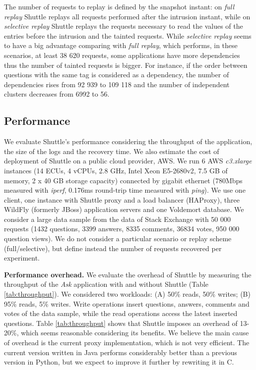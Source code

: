 The number of requests to replay is defined by the snapshot instant: on \textit{full replay} Shuttle replays all requests performed after the intrusion instant, while on \textit{selective replay} Shuttle replays the requests necessary to read the values of the entries before the intrusion and the tainted requests. While  \textit{selective replay} seems to have a big advantage comparing with  \textit{full replay}, which performs, in these scenarios, at least 38 620 requests, some applications have more dependencies thus the number of tainted requests is bigger. For instance, if the order between questions with the same tag is considered as a dependency, the number of dependencies rises from 92 939 to 109 118 and the number of independent clusters decreases from 6992 to 56. %



\subsection{Performance}
\label{sec:evaluation:performance}

We evaluate Shuttle's performance considering the throughput of the application, the size of the logs and the recovery time. We also estimate the cost of deployment of Shuttle on a public cloud provider, \acf{AWS}. We run 6 \ac{AWS} \textit{c3.xlarge} instances (14 ECUs, 4 vCPUs, 2.8 GHz, Intel Xeon E5-2680v2, 7.5 GB of memory, 2 x 40 GB storage capacity) connected by gigabit ethernet (780Mbps measured with \emph{iperf}, 0.176ms round-trip time measured with \emph{ping}). We use one client, one instance with Shuttle proxy and a load balancer (HAProxy), three WildFly (formerly JBoss) application servers and one Voldemort database. We consider a large data sample from the data of Stack Exchange with 50 000 requests (1432 questions, 3399 answers, 8335 comments, 36834 votes, 950 000 question views). We do not consider a particular scenario or replay scheme (full/selective), but define instead the number of requests recovered per experiment.

\textbf{Performance overhead.}
We evaluate the overhead of Shuttle by measuring the throughput of the \textit{Ask} application with and without Shuttle (Table \ref{tab:throughput}). We considered two workloads: (A) 50\% reads, 50\% writes;  (B)  95\% reads, 5\% writes. Write operations insert questions, answers, comments and votes of the data sample, while the read operations access the latest inserted questions. Table \ref{tab:throughput} shows that Shuttle imposes an overhead of 13-20\%, which seems reasonable considering its benefits. We believe the main cause of overhead is the current proxy implementation, which is not very efficient. The current version written in Java performs considerably better than a previous version in Python, but we expect to improve it further by rewriting it in C.

